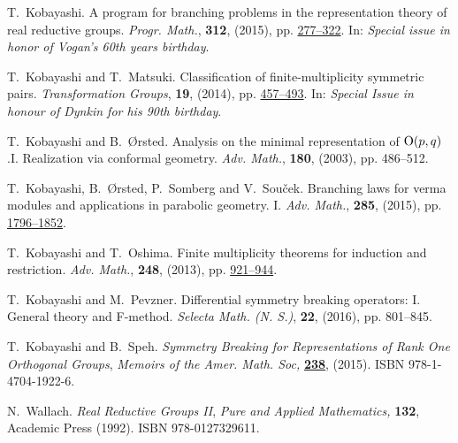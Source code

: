 \documentclass[10pt]{article} %
\theoremstyle{definition}
\begin{document}
\begin{thebibliography}{14}
T.~Kobayashi.
\newblock A program for branching problems in the representation theory of real
  reductive groups.
\newblock \emph{{\normalfont Progr. Math.}}, \textbf{312}, (2015), pp.
\href{http://dx.doi.org/10.1007/978-3-319-23443-4_10}{277--322}.
\newblock In: \emph{{\normalfont Special issue in honor of Vogan's 60th years
  birthday}}.

T.~Kobayashi and T.~Matsuki.
\newblock Classification of finite-multiplicity symmetric pairs.
\newblock \emph{{\normalfont Transformation Groups}}, \textbf{19}, (2014),
pp. \href{http://dx.doi.org/10.1007/s00031-014-9265-x}{457--493}.
\newblock In: \emph{{\normalfont Special Issue in honour of Dynkin
  for his 90th birthday}}.


T.~Kobayashi and B.~{\O}rsted.
\newblock Analysis on the minimal representation of\/ {${\rm
  O}(p,q)$}.{\;}{{\rm{I}}. Realization via conformal geometry}.
\newblock \emph{\normalfont Adv. Math.}, \textbf{180}, (2003), pp. 486--512.

T.~Kobayashi, B.~{\O}rsted, P.~Somberg and V.~Sou{\v{c}}ek.
\newblock Branching laws for verma modules and applications in parabolic
  geometry. {I}.
\newblock \emph{{\normalfont Adv. Math.}}, \textbf{285}, (2015), pp.
\href{http://dx.doi.org/10.1016/j.aim.2015.08.020}{1796--1852}.

T.~Kobayashi and T.~Oshima.
\newblock Finite multiplicity theorems for induction and restriction.
\newblock \emph{{\normalfont Adv. Math.}}, \textbf{248}, (2013), pp. \href{http://dx.doi.org/10.1016/j.aim.2013.07.015}{921--944}.

T.~Kobayashi and M.~Pevzner.
\newblock Differential symmetry breaking operators: I. {G}eneral theory and
  {F}-method.
\newblock \emph{{\normalfont Selecta Math. (N. S.)}}, \textbf{22}, (2016),
  pp. 801--845.

T.~Kobayashi and B.~Speh.
\newblock \emph{Symmetry {B}reaking for {R}epresentations of {R}ank {O}ne
  {O}rthogonal {G}roups}, \emph{{\normalfont Memoirs of the Amer. Math. Soc},}
  \textbf{\href{http://dx.doi.org/10.1090/memo/1126}{238}}, (2015).
\newblock ISBN 978-1-4704-1922-6.

N.~Wallach.
\newblock \emph{Real Reductive Groups II}, \emph{{\normalfont Pure and Applied
  Mathematics},} \textbf{132},
\newblock Academic {P}ress (1992).
\newblock ISBN 978-0127329611.

\end{thebibliography}
\end{document}
